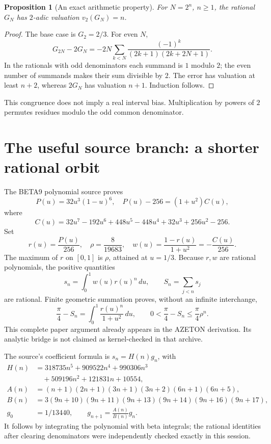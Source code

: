 \documentclass[10pt,a4paper]{article}
\newtheorem{proposition}[theorem]{Proposition}
\begin{document}
\begin{proposition}[An exact arithmetic property]
For $N=2^n$, $n\ge1$, the rational $G_N$ has $2$-adic valuation $v_2(G_N)=n$.
\end{proposition}
\begin{proof}
The base case is $G_2=2/3$. For even $N$,
\[
 G_{2N}-2G_N=-2N\sum_{k<N}
 \frac{(-1)^k}{(2k+1)(2k+2N+1)}.
\]
In the rationals with odd denominators each summand is $1$ modulo $2$; the even number of summands makes their sum divisible by $2$. The error has valuation at least $n+2$, whereas $2G_N$ has valuation $n+1$. Induction follows.
\end{proof}
This congruence does not imply a real interval bias. Multiplication by powers of $2$ permutes residues modulo the odd common denominator.

\newpage
\section{The useful source branch: a shorter rational orbit}
The BETA9 polynomial source proves
\[
 P(u)=32u^3(1-u)^6,\quad P(u)-256=(1+u^2)C(u),
\]
where
\[
 C(u)=32u^7-192u^6+448u^5-448u^4+32u^3+256u^2-256.
\]
Set
\[
 r(u)=\frac{P(u)}{256},\quad \rho=\frac8{19683},\quad
 w(u)=\frac{1-r(u)}{1+u^2}=-\frac{C(u)}{256}.
\]
The maximum of $r$ on $[0,1]$ is $\rho$, attained at $u=1/3$.
Because $r,w$ are rational polynomials, the positive quantities
\[
 s_n=\int_0^1w(u)r(u)^n\,du,
 \qquad S_n=\sum_{j<n}s_j
\]
are rational. Finite geometric summation proves, without an infinite interchange,
\[
 \boxed{\frac\pi4-S_n=\int_0^1\frac{r(u)^n}{1+u^2}\,du,
 \qquad0<\frac\pi4-S_n\le\frac\pi4\rho^n.}                 \tag{7}
\]
This complete paper argument already appears in the AZETON derivation. Its analytic bridge is not claimed as kernel-checked in that archive.

The source's coefficient formula is $s_n=H(n)g_n$, with
\begin{align*}
 H(n)&=318735n^5+909522n^4+990306n^3\\
     &\quad+509196n^2+121831n+10554,\\
 A(n)&=(n+1)(2n+1)(3n+1)(3n+2)(6n+1)(6n+5),\\
 B(n)&=3(9n+10)(9n+11)(9n+13)(9n+14)(9n+16)(9n+17),\\
 g_0&=1/13440,\qquad g_{n+1}=\frac{A(n)}{B(n)}g_n.
\end{align*}
It follows by integrating the polynomial with beta integrals; the rational identities after clearing denominators were independently checked exactly in this session.
\end{document}
